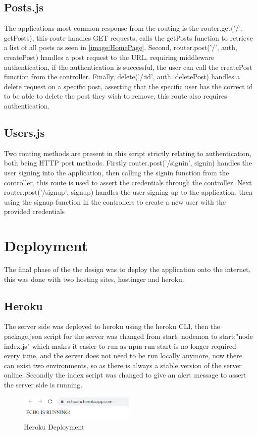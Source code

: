 \subsection{Posts.js}
The applications most common response from the routing is the router.get('/', getPosts), this route handles GET requests, calls the getPosts function to retrieve a list of all posts as seen in \ref{image:HomePage}. Second, router.post('/', auth, createPost) handles a post request to the URL, requiring middleware authentication, if the authentication is successful, the user can call the createPost function from the controller. Finally, delete('/:id', auth, deletePost) handles a delete request on a specific post, asserting that the specific user has the correct id to be able to delete the post they wish to remove, this route also requires authentication.

\subsection{Users.js}
Two routing methods are present in this script strictly relating to authentication, both being HTTP post methods. Firstly router.post('/signin', signin) handles the user signing into the application, then calling the signin function from the controller, this route is used to assert the credentials through the controller. Next router.post('/signup', signup) handles the user signing up to the application, then using the signup function in the controllers to create a new user with the provided credentials

\section{Deployment}
The final phase of the the design was to deploy the application onto the internet, this was done with two hosting sites, hostinger and heroku.

\subsection{Heroku}
The server side was deployed to heroku using the heroku CLI, then the package.json script for the server was changed from start: nodemon to start:"node index.js" which makes it easier to run as npm run start is no longer required every time, and the server does not need to be run locally anymore, now there can exist two environments, so as there is always a stable version of the server online. Secondly the index script was changed to give an alert message to assert the server side is running.
\begin{figure}[h!]
    \centering
    \includegraphics[width=0.5\textwidth]{images/deployment.png}
    \caption{Heroku Deployment}
    \label{image:deployment}
\end{figure}
